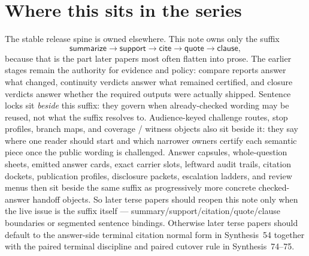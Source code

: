 \documentclass[11pt]{article}
\begin{document}
\section{Where this sits in the series}
The stable release spine is owned elsewhere.\cite{series:releasespine}
This note owns only the suffix
\[
\textsf{summarize} \to \textsf{support} \to \textsf{cite} \to \textsf{quote} \to \textsf{clause},
\]
because that is the part later papers most often flatten into prose.
The earlier stages remain the authority for evidence and policy: compare reports answer what changed, continuity verdicts answer what remained certified, and closure verdicts answer whether the required outputs were actually shipped.\cite{series:planstateequiv,series:auditorreplay}
Sentence locks sit \emph{beside} this suffix: they govern when already-checked wording may be reused, not what the suffix resolves to. Audience-keyed challenge routes, stop profiles, branch maps, and coverage / witness objects also sit beside it: they say where one reader should start and which narrower owners certify each semantic piece once the public wording is challenged. Answer capsules, whole-question sheets, emitted answer cards, exact carrier slots, leftward audit trails, citation dockets, publication profiles, disclosure packets, escalation ladders, and review menus then sit beside the same suffix as progressively more concrete checked-answer handoff objects. So later terse papers should reopen this note only when the live issue is the suffix itself --- summary/support/citation/quote/clause boundaries or segmented sentence bindings. Otherwise later terse papers should default to the answer-side terminal citation normal form in Synthesis~54 together with the paired terminal discipline and paired cutover rule in Synthesis~74--75.\cite{series:sentencelocks,series:challengeroutes,series:challengestops,series:challengebranches,series:challengecoverage,series:challengesurfacehooks,series:challengeterminalwitnesses,series:challengecoveragewitnesspacks,series:challengecoveragewitnessslices,series:challengecoveragewitnesscores,series:challengeanswercapsules,series:challengeanswersheets,series:challengeanswercards,series:challengeanswercarrierslots,series:challengeansweraudittrails,series:challengeanswercitationdockets,series:challengeanswerpublicationprofiles,series:challengeanswerdisclosurepackets,series:challengeanswerescalationladders,series:challengeanswerreviewmenus,series:pairedterminalcitationdiscipline,series:pairedterminalcutoverrules}
\end{document}
